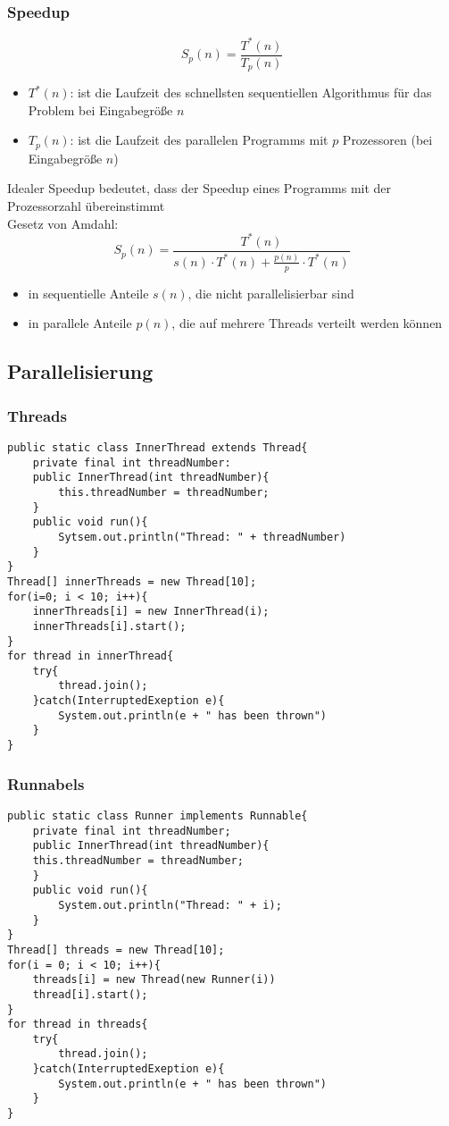 \subsubsection{Speedup}
$$
	S_p(n)=\frac{T^*(n)}{T_p(n)}
$$
\begin{itemize}
	\item $T^*(n)$: ist die Laufzeit des schnellsten sequentiellen Algorithmus
für das Problem bei Eingabegröße $n$
	\item $T_p(n)$: ist die Laufzeit des parallelen Programms mit $p$
Prozessoren (bei Eingabegröße $n$)
\end{itemize}
Idealer Speedup bedeutet, dass der Speedup eines
Programms mit der Prozessorzahl übereinstimmt \\
Gesetz von Amdahl:
$$
	S_p(n)=\frac{T^*(n)}{s(n)\cdot T^*(n) + \frac{p(n)}{p}\cdot T^*(n)}
$$
\begin{itemize}
	\item in sequentielle Anteile $s(n)$, die nicht parallelisierbar sind
	\item in parallele Anteile $p(n)$, die auf mehrere Threads verteilt werden können
\end{itemize}
\subsection{Parallelisierung}
\subsubsection{Threads}
\begin{verbatim}
public static class InnerThread extends Thread{
    private final int threadNumber:
    public InnerThread(int threadNumber){
        this.threadNumber = threadNumber;
    }
    public void run(){
        Sytsem.out.println("Thread: " + threadNumber)
    }
}
Thread[] innerThreads = new Thread[10];
for(i=0; i < 10; i++){
    innerThreads[i] = new InnerThread(i);
    innerThreads[i].start();
}
for thread in innerThread{
    try{
        thread.join();
    }catch(InterruptedExeption e){
        System.out.println(e + " has been thrown")
    }
}
\end{verbatim}
\subsubsection{Runnabels}
\begin{verbatim}
public static class Runner implements Runnable{
    private final int threadNumber;
    public InnerThread(int threadNumber){
    this.threadNumber = threadNumber;
    }
    public void run(){
        System.out.println("Thread: " + i);
    }
}
Thread[] threads = new Thread[10];
for(i = 0; i < 10; i++){
    threads[i] = new Thread(new Runner(i))
    thread[i].start();
}
for thread in threads{
    try{
        thread.join();
    }catch(InterruptedExeption e){
        System.out.println(e + " has been thrown")
    }
}
\end{verbatim}
